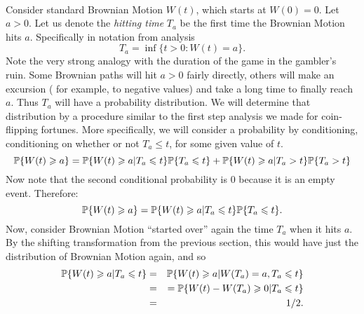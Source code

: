 \begin{problem}
  \\
  Consider standard Brownian Motion $W(t)$, which starts at $W(0) = 0.$
  Let $ a > 0 $.  Let us denote the \emph{hitting time} $ T_a $ be the
  first time the Brownian Motion hits $ a $.  Specifically in notation
  from analysis
  $$
    T_a = \inf \{t > 0 :  W(t) = a \}.
  $$
  Note the very strong analogy with the duration of the game in the
  gambler's ruin. Some Brownian paths will hit $a>0$ fairly directly, 
  others will make an excursion ( for example, to negative values) and take 
  a long time to finally reach $a$. Thus $T_a$ will have a probability 
  distribution. We will determine that distribution by a procedure similar 
  to the first step analysis we made for coin-flipping fortunes. More specifically, 
  we will consider a probability by conditioning, conditioning on whether or not 
  $T_a \le t$, for some given value of $t$.
  $$
    \P\{W(t) \ge a\} = \P\{ W(t) \ge a | T_a \le t\} \P\{T_a \le t\} + 
    \P\{W(t) \ge a | T_a > t\} \P\{T_a > t\}
  $$
  Now note that the second conditional probability is $0$ because it is
  an empty event.  Therefore:
  $$
    \P\{ W(t) \ge a\} = \P\{ W(t) \ge a | T_a \le t\} \P\{T_a \le t\}.
  $$
  Now, consider Brownian Motion ``started over'' again the time $T_a$
  when it hits $a$.  By the shifting transformation from the previous
  section, this would have just the distribution of Brownian Motion again,
  and so
  \begin{eqnarray*}
    \P\{ W(t) \ge a | T_a \le t\} &=& \P\{ W(t) \ge a | W(T_a)=a,T_a\le t\} \\
    &=&= \P\{ W(t) - W(T_a) \ge 0 | T_a \le t\} \\
    &=& 1/2.
  \end{eqnarray*}


\end{problem}
